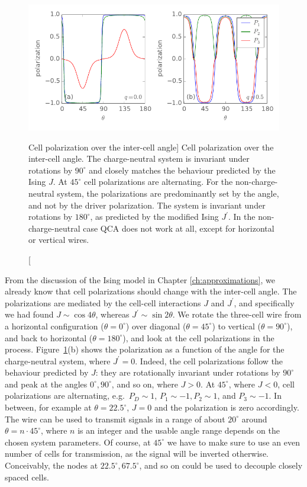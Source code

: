 \begin{figure}
  \center
  \includegraphics{three_cells_P_over_theta}
  \caption
  [Cell polarization over the inter-cell angle]
  {
  Cell polarization over the inter-cell angle. The charge-neutral system is
  invariant under rotations by $90^{\circ}$ and closely matches the behaviour
  predicted by the Ising $J$. At $45^{\circ}$ cell polarizations are
  alternating. For the non-charge-neutral system, the polarizations are
  predominantly set by the angle, and not by the driver polarization. The system
  is invariant under rotations by $180^{\circ}$, as predicted by the modified
  Ising $J^{\prime}$. In the non-charge-neutral case QCA does not work at all,
  except for horizontal or vertical wires.
  }
  \label{fig:three_cells_P_over_theta}
\end{figure}

From the discussion of the Ising model in Chapter \ref{ch:approximations}, we
already know that cell polarizations should change with the inter-cell angle.
The polarizations are mediated by the cell-cell interactions $J$ and
$J^{\prime}$, and specifically we had found $J \sim \cos{4 \theta}$, whereas
$J^{\prime} \sim \sin{2 \theta}$. We rotate the three-cell wire from a
horizontal configuration ($\theta = 0^{\circ}$) over diagonal ($\theta =
45^{\circ}$) to vertical ($\theta = 90^{\circ}$), and back to horizontal
($\theta = 180^{\circ}$), and look at the cell polarizations in the process.
Figure~\ref{fig:three_cells_P_over_theta}(b) shows the polarization as a function
of the angle for the charge-neutral system, where $J^{\prime} = 0$. Indeed, the
cell polarizations follow the behaviour predicted by $J$: they are rotationally
invariant under rotations by $90^{\circ}$ and peak at the angles $0^{\circ},
90^{\circ}$, and so on, where $J > 0$. At $45^{\circ}$, where $J < 0$, cell
polarizations are alternating, e.g.~$P_D \sim 1$, $P_1 \sim -1, P_2 \sim 1$, and
$P_3 \sim -1$. In between, for example at $\theta = 22.5^{\circ}$, $J = 0$ and
the polarization is zero accordingly. The wire can be used to transmit signals
in a range of about $20^{\circ}$ around $\theta = n \cdot 45^{\circ}$, where $n$
is an integer and the usable angle range depends on the chosen system
parameters. Of course, at $45^{\circ}$ we have to make sure to use an even
number of cells for transmission, as the signal will be inverted otherwise.
Conceivably, the nodes at $22.5^{\circ}, 67.5^{\circ}$, and so on could be used
to decouple closely spaced cells.

